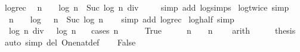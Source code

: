 \begin{isabellebody}
%
\isadelimproof
\isanewline
%
\endisadelimproof
\isanewline
{}\isamarkupfalse%
\ log{\isacharunderscore}rec{\isacharcolon}\isanewline
\ \ {\isachardoublequoteopen}n\ {\isasymge}\ {}\ {\isasymLongrightarrow}\ log\ n\ {\isacharequal}\ Suc\ {\isacharparenleft}log\ {\isacharparenleft}n\ div\ {}{\isacharparenright}{\isacharparenright}{\isachardoublequoteclose}\isanewline
%
\isadelimproof
\ \ %
\endisadelimproof
%
\isatagproof
{}\isamarkupfalse%
\ {\isacharparenleft}simp\ add{\isacharcolon}\ log{\isachardot}simps{\isacharparenright}%
\endisatagproof
{\isafoldproof}%
%
\isadelimproof
\isanewline
%
\endisadelimproof
\isanewline
{}\isamarkupfalse%
\ log{\isacharunderscore}twice\ {\isacharbrackleft}simp{\isacharbrackright}{\isacharcolon}\isanewline
\ \ {\isachardoublequoteopen}n\ {\isasymnoteq}\ {}\ {\isasymLongrightarrow}\ log\ {\isacharparenleft}{}\ {\isacharasterisk}\ n{\isacharparenright}\ {\isacharequal}\ Suc\ {\isacharparenleft}log\ n{\isacharparenright}{\isachardoublequoteclose}\isanewline
%
\isadelimproof
\ \ %
\endisadelimproof
%
\isatagproof
{}\isamarkupfalse%
\ {\isacharparenleft}simp\ add{\isacharcolon}\ log{\isacharunderscore}rec{\isacharparenright}%
\endisatagproof
{\isafoldproof}%
%
\isadelimproof
\isanewline
%
\endisadelimproof
\isanewline
{}\isamarkupfalse%
\ log{\isacharunderscore}half\ {\isacharbrackleft}simp{\isacharbrackright}{\isacharcolon}\isanewline
\ \ {\isachardoublequoteopen}log\ {\isacharparenleft}n\ div\ {}{\isacharparenright}\ {\isacharequal}\ log\ n\ {\isacharminus}\ {}{\isachardoublequoteclose}\isanewline
%
\isadelimproof
%
\endisadelimproof
%
\isatagproof
{}\isamarkupfalse%
\ {\isacharparenleft}cases\ {\isachardoublequoteopen}n\ {\isacharless}\ {}{\isachardoublequoteclose}{\isacharparenright}\isanewline
\ \ \isamarkupfalse%
\ True\isanewline
\ \ \isamarkupfalse%
\ \isamarkupfalse%
\ {\isachardoublequoteopen}n\ {\isacharequal}\ {}\ {\isasymor}\ n\ {\isacharequal}\ {}{\isachardoublequoteclose}\ \isamarkupfalse%
\ arith\isanewline
\ \ \isamarkupfalse%
\ \isamarkupfalse%
\ {\isacharquery}thesis\ \isamarkupfalse%
\ {\isacharparenleft}auto\ simp\ del{\isacharcolon}\ One{\isacharunderscore}nat{\isacharunderscore}def{\isacharparenright}\isanewline
{}\isamarkupfalse%
\isanewline
\ \ \isamarkupfalse%
\ False\ \isamarkupfalse%

\end{isabellebody}
